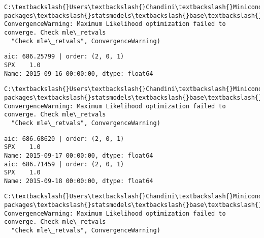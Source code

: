 \documentclass[11pt]{article}
\begin{document}
    \begin{Verbatim}[commandchars=\\\{\}]
C:\textbackslash{}Users\textbackslash{}Chandini\textbackslash{}Miniconda3\textbackslash{}envs\textbackslash{}auquan\textbackslash{}lib\textbackslash{}site-packages\textbackslash{}statsmodels\textbackslash{}base\textbackslash{}model.py:496: ConvergenceWarning: Maximum Likelihood optimization failed to converge. Check mle\_retvals
  "Check mle\_retvals", ConvergenceWarning)

    \end{Verbatim}

    \begin{Verbatim}[commandchars=\\\{\}]
aic: 686.25799 | order: (2, 0, 1)
SPX    1.0
Name: 2015-09-16 00:00:00, dtype: float64

    \end{Verbatim}

    \begin{Verbatim}[commandchars=\\\{\}]
C:\textbackslash{}Users\textbackslash{}Chandini\textbackslash{}Miniconda3\textbackslash{}envs\textbackslash{}auquan\textbackslash{}lib\textbackslash{}site-packages\textbackslash{}statsmodels\textbackslash{}base\textbackslash{}model.py:496: ConvergenceWarning: Maximum Likelihood optimization failed to converge. Check mle\_retvals
  "Check mle\_retvals", ConvergenceWarning)

    \end{Verbatim}

    \begin{Verbatim}[commandchars=\\\{\}]
aic: 686.68620 | order: (2, 0, 1)
SPX    1.0
Name: 2015-09-17 00:00:00, dtype: float64
aic: 686.71459 | order: (2, 0, 1)
SPX    1.0
Name: 2015-09-18 00:00:00, dtype: float64

    \end{Verbatim}

    \begin{Verbatim}[commandchars=\\\{\}]
C:\textbackslash{}Users\textbackslash{}Chandini\textbackslash{}Miniconda3\textbackslash{}envs\textbackslash{}auquan\textbackslash{}lib\textbackslash{}site-packages\textbackslash{}statsmodels\textbackslash{}base\textbackslash{}model.py:496: ConvergenceWarning: Maximum Likelihood optimization failed to converge. Check mle\_retvals
  "Check mle\_retvals", ConvergenceWarning)

    \end{Verbatim}
\end{document}
